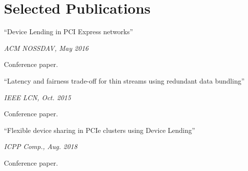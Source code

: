 \section{Selected Publications}
\parbox[t][][t]{\linewidth}{
	\parbox{\linewidth}{{``Device Lending in PCI Express networks''}}
	\smallbreak
	\parbox{\linewidth}{\emph{ACM NOSSDAV, May 2016}}
	\smallbreak
	Conference paper.
	\bigbreak
}

\parbox[t][][t]{\linewidth}{
	\parbox{\linewidth}{{``Latency and fairness trade-off for thin
	streams using redundant data bundling''}}
	\smallbreak
	\parbox{\linewidth}{\emph{IEEE LCN, Oct. 2015}}
	\smallbreak
	Conference paper.
	\bigbreak
}

\parbox[t][][t]{\linewidth}{
	\parbox{\linewidth}{{``Flexible device sharing in PCIe clusters using Device Lending''}}
	\smallbreak
	\parbox{\linewidth}{\emph{ICPP Comp., Aug. 2018}}
	\smallbreak
	Conference paper.
	\bigbreak
}

